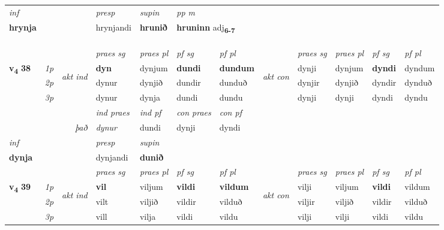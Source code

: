 \begin{longtable}[l]{X>{\footnotesize\itshape}llXXXXlXXXX}
   {\textit{inf}} & &     & \textit{presp} & \textit{supin}  & \textit{pp m} \\*
  {\textbf{hrynja}} & &     & hrynjandi &  \textbf{hrunið}  & \multicolumn{2}{l}{\textbf{hruninn} adj\textbf{\textsubscript{6-7}}} \\*

\midrule
  & \\*
   & \\*
  & \\
   \midrule

 & &   & \textit{praes sg}  & \textit{praes pl}    & \textit{ pf sg} & \textit{pf pl} & & \textit{praes sg}  & \textit{praes pl}    & \textit{pf sg} & \textit{pf pl }  \\ \cmidrule{4-7} \cmidrule{9-12}
 \multirow{2}{*}{{{\textbf{v{\textsubscript{4}}} \Large{\textbf{38}}}}}  & 1p & \multirow{3}{*}{\begin{turn}{90}\textit{akt ind}\end{turn}} & \textbf{dyn} & dynjum & \textbf{dundi} & \textbf{dundum} & \multirow{3}{*}{\begin{turn}{90}\textit{akt con}\end{turn}} &dynji & dynjum & \textbf{dyndi} & dyndum\\*
 & 2p &  &  dynur  & dynjið & dundir & dunduð & & dynjir & dynjið & dyndir & dynduð \\*
 & 3p &  & dynur & dynja & dundi & dundu & & dynji & dynji& dyndi & dyndu \\*
\cmidrule{4-7} \cmidrule{9-12}

   && &  \textit{ind praes} & \textit{ind pf} & \textit{con praes} & \textit{con pf} \\*
\multicolumn{3}{r}{\textit{það}} & dynur & dundi & dynji & dyndi \\*

\cmidrule{4-7}
   {\textit{inf}} & &     & \textit{presp} & \textit{supin}   \\*
  {\textbf{dynja}} & &     & dynjandi &  \textbf{dunið}   \\*

\midrule

 & &   & \textit{praes sg}  & \textit{praes pl}    & \textit{ pf sg} & \textit{pf pl} & & \textit{praes sg}  & \textit{praes pl}    & \textit{pf sg} & \textit{pf pl }  \\ \cmidrule{4-7} \cmidrule{9-12}
 \multirow{2}{*}{{{\textbf{v{\textsubscript{4}}} \Large{\textbf{39}}}}}  & 1p & \multirow{3}{*}{\begin{turn}{90}\textit{akt ind}\end{turn}} & \textbf{vil} & viljum & \textbf{vildi} & \textbf{vildum} & \multirow{3}{*}{\begin{turn}{90}\textit{akt con}\end{turn}} &vilji & viljum & \textbf{vildi} & vildum\\*
 & 2p &  &  vilt  & viljið & vildir & vilduð & & viljir & viljið & vildir & vilduð \\*
 & 3p &  & vill & vilja & vildi & vildu & & vilji & vilji& vildi & vildu \\*
\cmidrule{4-7} \cmidrule{9-12}


\end{longtable}
